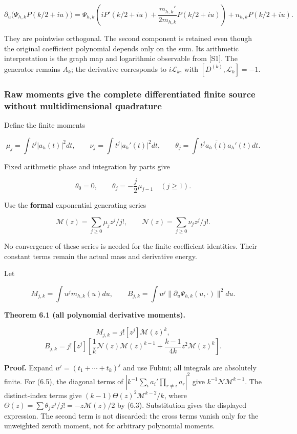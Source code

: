 \documentclass[
]{article}
\begin{document}
\[\boxed{\partial_u\bigl(\Psi_{h,k}P(k/2+iu)\bigr)
=\Psi_{h,k}\left(iP'(k/2+iu)+\frac{m_{h,k}'}{2m_{h,k}}P(k/2+iu)\right)
+n_{h,k}P(k/2+iu).}\tag{6.2}\]

They are pointwise orthogonal. The second component is retained even
though the original coefficient polynomial depends only on the sum. Its
arithmetic interpretation is the graph map and logarithmic observable
from {[}S1{]}. The generator remains \(A_k\); the derivative corresponds
to \(i\mathscr L_k\), with \([D^{(k)},\mathscr L_k]=-1\).

\subsubsection{Raw moments give the complete differentiated finite
source without multidimensional
quadrature}\label{raw-moments-give-the-complete-differentiated-finite-source-without-multidimensional-quadrature}

Define the finite moments

\[\mu_j=\int t^j|a_h(t)|^2dt,\qquad
\nu_j=\int t^j|a_h'(t)|^2dt,\qquad
\theta_j=\int t^j\overline{a_h(t)}a_h'(t)dt.\]

Fixed arithmetic phase and integration by parts give

\[\theta_0=0,\qquad \theta_j=-\frac j2\mu_{j-1}\quad(j\ge1).\tag{6.3}\]

Use the \textbf{formal} exponential generating series

\[\mathcal M(z)=\sum_{j\ge0}\mu_jz^j/j!,\qquad
\mathcal N(z)=\sum_{j\ge0}\nu_jz^j/j!.\]

No convergence of these series is needed for the finite coefficient
identities. Their constant terms remain the actual mass and derivative
energy.

Let

\[M_{j,k}=\int u^jm_{h,k}(u)du,\qquad
B_{j,k}=\int u^j\|\partial_u\Psi_{h,k}(u,\cdot)\|^2du.\]

\textbf{Theorem 6.1 (all polynomial derivative moments).}

\[\boxed{M_{j,k}=j![z^j]\mathcal M(z)^k,}\tag{6.4}\]
\[\boxed{B_{j,k}=j![z^j]\left[
\frac1k\mathcal N(z)\mathcal M(z)^{k-1}
+\frac{k-1}{4k}z^2\mathcal M(z)^k\right].}\tag{6.5}\]

\textbf{Proof.} Expand \(u^j=(t_1+\cdots+t_k)^j\) and use Fubini; all
integrals are absolutely finite. For (6.5), the diagonal terms of
\(|k^{-1}\sum_i a_i'\prod_{r\ne i}a_r|^2\) give
\(k^{-1}\mathcal N\mathcal M^{k-1}\). The distinct-index terms give
\((k-1)\Theta(z)^2\mathcal M^{k-2}/k\), where
\(\Theta(z)=\sum\theta_jz^j/j!=-z\mathcal M(z)/2\) by (6.3).
Substitution gives the displayed expression. The second term is not
discarded: the cross terms vanish only for the unweighted zeroth moment,
not for arbitrary polynomial moments.
\end{document}
